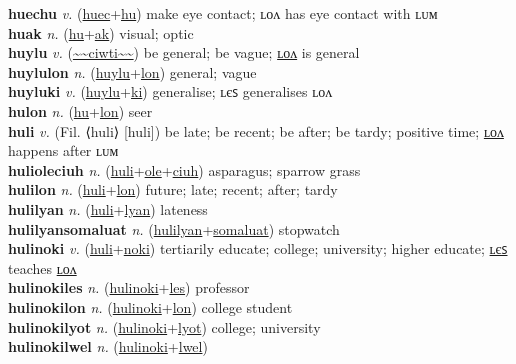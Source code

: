 \textbf{huechu} \textit{v.} (\hyperref[huec]{huec}+\hyperref[hu]{hu})
make eye contact; ʟᴏᴧ has eye contact with ʟᴜᴍ \label{huechu} \\
\textbf{huak} \textit{n.} (\hyperref[hu]{hu}+\hyperref[ak]{ak})
visual; optic \label{huak} \\
\textbf{huylu} \textit{v.} (\hyperref[ciwti]{\~{}\~{}ciwti\~{}\~{}})
be general; be vague; \hyperref[huylulon]{ʟᴏᴧ} is general \label{huylu} \\
\textbf{huylulon} \textit{n.} (\hyperref[huylu]{huylu}+\hyperref[lon]{lon})
general; vague \label{huylulon} \\
\textbf{huyluki} \textit{v.} (\hyperref[huylu]{huylu}+\hyperref[ki]{ki})
generalise; ʟєꜱ generalises ʟᴏᴧ \label{huyluki} \\
\textbf{hulon} \textit{n.} (\hyperref[hu]{hu}+\hyperref[lon]{lon})
seer \label{hulon} \\
\textbf{huli} \textit{v.} (Fil. ⟨huli⟩ [huli])
be late; be recent; be after; be tardy; positive time; \hyperref[hulilon]{ʟᴏᴧ} happens after ʟᴜᴍ \label{huli} \\
\textbf{hulioleciuh} \textit{n.} (\hyperref[huli]{huli}+\hyperref[ole]{ole}+\hyperref[ciuh]{ciuh})
asparagus; sparrow grass \label{hulioleciuh} \\
\textbf{hulilon} \textit{n.} (\hyperref[huli]{huli}+\hyperref[lon]{lon})
future; late; recent; after; tardy \label{hulilon} \\
\textbf{hulilyan} \textit{n.} (\hyperref[huli]{huli}+\hyperref[lyan]{lyan})
lateness \label{hulilyan} \\
\textbf{hulilyansomaluat} \textit{n.} (\hyperref[hulilyan]{hulilyan}+\hyperref[somaluat]{somaluat})
stopwatch \label{hulilyansomaluat} \\
\textbf{hulinoki} \textit{v.} (\hyperref[huli]{huli}+\hyperref[noki]{noki})
tertiarily educate; college; university; higher educate; \hyperref[hulinokiles]{ʟєꜱ} teaches \hyperref[hulinokilon]{ʟᴏᴧ} \label{hulinoki} \\
\textbf{hulinokiles} \textit{n.} (\hyperref[hulinoki]{hulinoki}+\hyperref[les]{les})
professor \label{hulinokiles} \\
\textbf{hulinokilon} \textit{n.} (\hyperref[hulinoki]{hulinoki}+\hyperref[lon]{lon})
college student \label{hulinokilon} \\
\textbf{hulinokilyot} \textit{n.} (\hyperref[hulinoki]{hulinoki}+\hyperref[lyot]{lyot})
college; university \label{hulinokilyot} \\
\textbf{hulinokilwel} \textit{n.} (\hyperref[hulinoki]{hulinoki}+\hyperref[lwel]{lwel})
